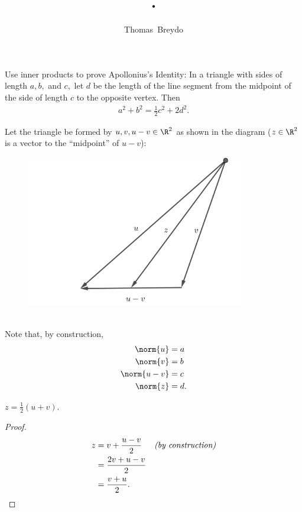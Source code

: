\documentclass{amsart}
\title{\pagenum.\probnum}
\author{Thomas\ Breydo}
\begin{document}
\maketitle

\begin{problem*}
Use inner products to prove Apollonius's Identity: In a triangle with
sides of length $a,b,$ and $c,$ let $d$ be the length of the line segment
from the midpoint of the side of length $c$ to the opposite vertex. Then
\begin{align*}
    a^2 + b^2 = \frac12 c^2 + 2d^2.
\end{align*}
\end{problem*}
\vspace{0.5in}

Let the triangle be formed by $u,v,u-v\in\R^2$ as shown in the diagram
($z\in\R^2$ is a vector to the ``midpoint'' of $u-v$):
\begin{figure}[h]
    \centering
    \includegraphics[width=0.85\textwidth]{179_31_triangle.png}
\end{figure}\\
Note that, by construction,
\begin{align*}
    \norm{u} &= a \\
    \norm{v} &= b \\
    \norm{u-v} &= c \\
    \norm{z} &= d.
\end{align*}

\begin{claim*}
    $z=\frac12(u+v).$
\end{claim*}
\begin{proof}
\begin{align*}
    z &= v + \frac{u-v}2 && \textit{(by construction)}\\
      &= \frac{2v+u-v}2 \\
      &= \frac{v+u}2.\qedhere
\end{align*}
\end{proof}
\end{document}
